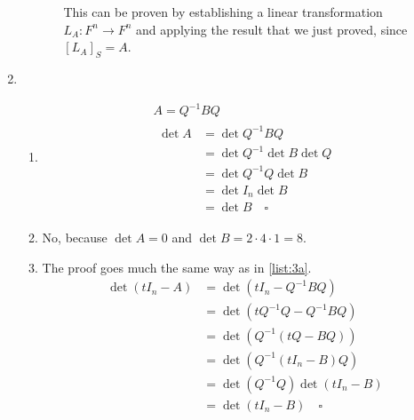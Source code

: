 \documentclass[12pt]{article}
\begin{document}
\begin{enumerate}
\begin{enumerate}
\begin{enumerate}
                                    This can be proven by establishing a linear transformation $L_A: F^n \rightarrow F^n$
                                    and applying the result that we just proved, since $[L_A]_S=A$.
                        \end{enumerate}
            \end{enumerate}
      \item \begin{enumerate}
                  \item \begin{gather*}
                              A=Q^{-1}BQ \\
                              \begin{aligned}
                                    \det A & = \det Q^{-1}BQ             \\
                                           & = \det Q^{-1} \det B \det Q \\
                                           & = \det Q^{-1}Q \det B       \\
                                           & = \det I_n \det B           \\
                                           & = \det B\quad\square
                              \end{aligned}
                        \end{gather*} \label{list:3a}
                  \item No, because $\det A=0$ and $\det B=2 \cdot 4 \cdot 1=8$.
                  \item The proof goes much the same way as in \ref{list:3a}.
                        \begin{align*}
                              \det (tI_n-A) & = \det \left(tI_n - Q^{-1}BQ\right)       \\
                                            & = \det \left(tQ^{-1}Q-Q^{-1}BQ\right)     \\
                                            & = \det \left(Q^{-1}(tQ-BQ)\right)         \\
                                            & = \det \left(Q^{-1}(tI_n-B)Q\right)       \\
                                            & = \det \left(Q^{-1}Q\right) \det (tI_n-B) \\
                                            & = \det (tI_n-B)\quad\square
                        \end{align*} \label{list:3c}

\end{enumerate}
\end{enumerate}
\end{document}
